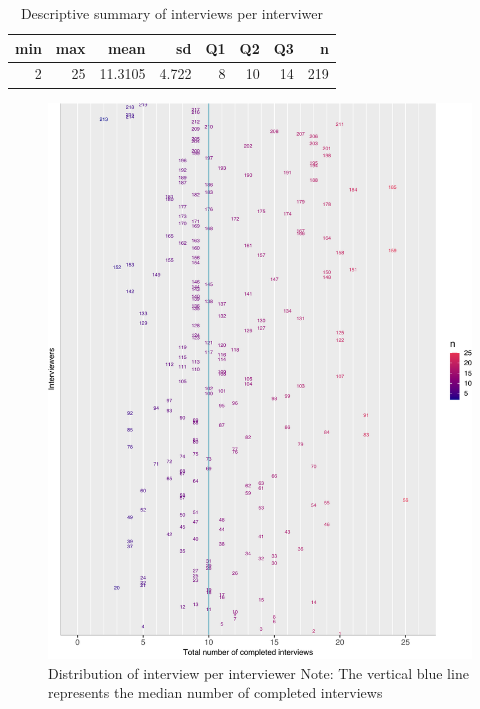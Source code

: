 \documentclass[
  11pt,
  a4paperpaper,
]{article}
\begin{document}
\begin{table}[!h]

\caption{\label{tab:nperm}\label{tab:table_nperm} Descriptive summary of interviews per interviwer}
\centering
\begin{tabular}[t]{r|r|r|r|r|r|r|r}
\hline
min & max & mean & sd & Q1 & Q2 & Q3 & n\\
\hline
2 & 25 & 11.3105 & 4.722 & 8 & 10 & 14 & 219\\
\hline
\end{tabular}
\end{table}

\begin{figure}[H]
\includegraphics{Analysis_InterimD_R11_R10example-sav_files/figure-latex/nperm_plot-1} \caption[Distribution of interviews per interviewer]{\label{fig:nperm_plot} Distribution of interview per interviewer \hspace{\textwidth} Note: The vertical blue line represents the median number of completed interviews}\label{fig:nperm_plot}
\end{figure}
\end{document}
